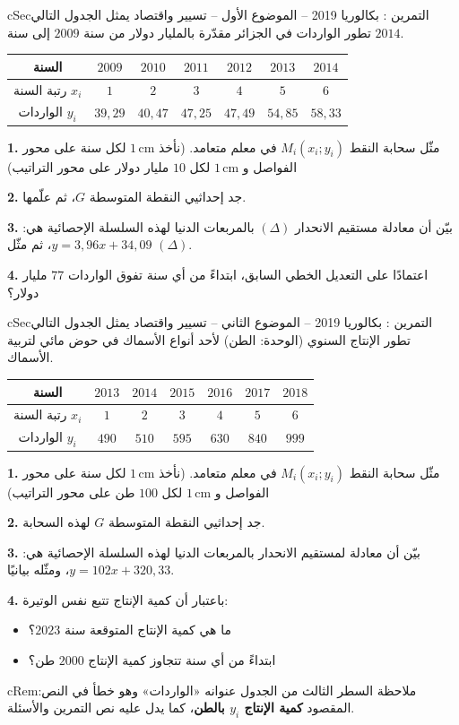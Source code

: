 \documentclass[12pt,a4paper]{article}
\newenvironment{BOX}[2]{\begin{otherlanguage}{english}\begin{arbox}{#1}{#2}}{\end{arbox}\end{otherlanguage}}
\newenvironment{molahada}[1][ملاحظة]{\begin{BOX}{cRem}{#1}}{\end{BOX}}
\newcounter{exo}
\newenvironment{tamrin}[1]{\stepcounter{exo}\begin{BOX}{cSec}{التمرين \theexo: #1}}{\end{BOX}}
\newenvironment{sq}{\begin{itemize}[leftmargin=2.4em,itemsep=3pt]}{\end{itemize}}
\newcommand{\qa}{\item[(أ)]}\newcommand{\qb}{\item[(ب)]}\newcommand{\qc}{\item[(جـ)]}\newcommand{\qd}{\item[(د)]}\newcommand{\qe}{\item[(هـ)]}
\newcommand{\QQ}[1]{\par\smallskip\textbf{#1.} }
\begin{document}
\begin{tamrin}{بكالوريا 2019 -- الموضوع الأول -- تسيير واقتصاد}
يمثل الجدول التالي تطور الواردات في الجزائر مقدّرة بالمليار دولار من سنة $2009$ إلى سنة $2014$.
\begin{center}
\begin{tabular}{|C|c|c|c|c|c|c|}\hline
{} السنة & $2009$ & $2010$ & $2011$ & $2012$ & $2013$ & $2014$\\\hline
رتبة السنة $x_i$ & $1$ & $2$ & $3$ & $4$ & $5$ & $6$\\\hline
الواردات $y_i$ & $39{,}29$ & $40{,}47$ & $47{,}25$ & $47{,}49$ & $54{,}85$ & $58{,}33$\\\hline
\end{tabular}
\end{center}

\QQ{1} مثّل سحابة النقط $M_i(x_i;y_i)$ في معلم متعامد. (نأخذ $1\,\text{cm}$ لكل سنة على محور الفواصل و $1\,\text{cm}$ لكل $10$ مليار دولار على محور التراتيب)
\QQ{2} جد إحداثيي النقطة المتوسطة $G$، ثم علّمها.
\QQ{3} بيّن أن معادلة مستقيم الانحدار $(\Delta)$ بالمربعات الدنيا لهذه السلسلة الإحصائية هي: $y=3{,}96x+34{,}09$، ثم مثّل $(\Delta)$.
\QQ{4} اعتمادًا على التعديل الخطي السابق، ابتداءً من أي سنة تفوق الواردات $77$ مليار دولار؟
\end{tamrin}
\Needspace{12.5cm}

\begin{tamrin}{بكالوريا 2019 -- الموضوع الثاني -- تسيير واقتصاد}
يمثل الجدول التالي تطور الإنتاج السنوي (الوحدة: الطن) لأحد أنواع الأسماك في حوض مائي لتربية الأسماك.
\begin{center}
\begin{tabular}{|C|c|c|c|c|c|c|}\hline
{} السنة & $2013$ & $2014$ & $2015$ & $2016$ & $2017$ & $2018$\\\hline
رتبة السنة $x_i$ & $1$ & $2$ & $3$ & $4$ & $5$ & $6$\\\hline
الواردات $y_i$ & $490$ & $510$ & $595$ & $630$ & $840$ & $999$\\\hline
\end{tabular}
\end{center}

\QQ{1} مثّل سحابة النقط $M_i(x_i;y_i)$ في معلم متعامد. (نأخذ $1\,\text{cm}$ لكل سنة على محور الفواصل و $1\,\text{cm}$ لكل $100$ طن على محور التراتيب)
\QQ{2} جد إحداثيي النقطة المتوسطة $G$ لهذه السحابة.
\QQ{3} بيّن أن معادلة لمستقيم الانحدار بالمربعات الدنيا لهذه السلسلة الإحصائية هي: $y=102x+320{,}33$، ومثّله بيانيًا.
\QQ{4} باعتبار أن كمية الإنتاج تتبع نفس الوتيرة:
\begin{sq}
\qa ما هي كمية الإنتاج المتوقعة سنة $2023$؟
\qb ابتداءً من أي سنة تتجاوز كمية الإنتاج $2000$ طن؟
\end{sq}
\end{tamrin}
\begin{molahada}
السطر الثالث من الجدول عنوانه «الواردات» وهو خطأ في النص: المقصود \textbf{كمية الإنتاج $y_i$ بالطن}، كما يدل عليه نص التمرين والأسئلة.
\end{molahada}
\Needspace{14.5cm}
\end{document}
